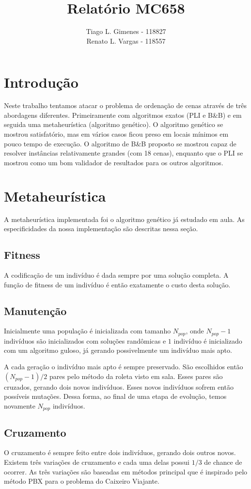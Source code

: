 \documentclass[a4paper,11pt]{article}
\title{Relatório MC658}
\author{Tiago L. Gimenes - 118827\\
        Renato L. Vargas - 118557}
\begin{document}
\maketitle

\section*{Introdução}
Neste trabalho tentamos atacar o problema de ordenação de cenas através de três
abordagens diferentes. Primeiramente com algoritmos exatos (PLI e B\&B) e em seguida
uma metaheurística (algoritmo genético). O algoritmo genético se mostrou satisfatório,
mas em vários casos ficou preso em locais mínimos em pouco tempo de execução. O algoritmo de B\&B
proposto se mostrou capaz de resolver instâncias relativamente grandes (com 18 cenas),
enquanto que o PLI se mostrou como um bom validador de resultados para os outros
algoritmos.

\section{Metaheurística}
A metaheurística implementada foi o algoritmo genético já estudado em aula.
As especificidades da nossa implementação são descritas nessa seção.

\subsection{Fitness}
A codificação de um indivíduo é dada sempre por uma solução completa.
A função de fitness de um indivíduo é então exatamente o custo desta solução.

\subsection{Manutenção}
Inicialmente uma população é inicializada com tamanho $N_{pop}$, onde $N_{pop}-1$ indivíduos são
inicializados com soluções randômicas e $1$ indivíduo é inicializado com um algoritmo
guloso, já gerando possivelmente um indivíduo mais apto.

A cada geração o indivíduo mais apto é sempre preservado. São escolhidos então $(N_{pop}-1)/2$
pares pelo método da roleta visto em sala. Esses pares são cruzados, gerando dois novos
indivíduos. Esses novos indivíduos sofrem então possíveis mutações. Dessa forma, ao final
de uma etapa de evolução, temos novamente $N_{pop}$ indivíduos.

\subsection{Cruzamento}
O cruzamento é sempre feito entre dois indivíduos, gerando dois outros novos.
Existem três variações de cruzamento e cada uma delas possui $1/3$ de chance de ocorrer.
As três variações são baseadas em métodos principal que é inspirado pelo método PBX
para o problema do Caixeiro Viajante.
\end{document}
